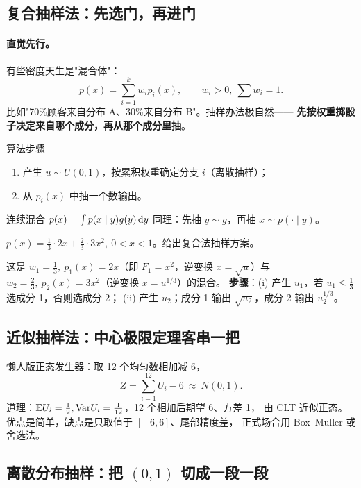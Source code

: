 \subsection{复合抽样法：先选门，再进门}

\paragraph{直觉先行。}
有些密度天生是"混合体"：
\[
p(x)=\sum_{i=1}^k w_ip_i(x),\qquad w_i>0,\ \textstyle\sum w_i=1.
\]
比如"70\%顾客来自分布 A、30\%来自分布 B"。抽样办法极自然——
\textbf{先按权重掷骰子决定来自哪个成分，再从那个成分里抽}。

\begin{ebox}{算法步骤}
\begin{enumerate}[leftmargin=2em]
  \item 产生 $u\sim U(0,1)$，按累积权重确定分支 $i$（离散抽样）；
  \item 从 $p_i(x)$ 中抽一个数输出。
\end{enumerate}
连续混合 $p(x)=\int p(x\mid y)g(y)\,\mathrm{d} y$ 同理：先抽 $y\sim g$，再抽 $x\sim p(\cdot\mid y)$。
\end{ebox}

\begin{exbox}[复合法抽样]
$p(x)=\frac13\cdot 2x+\frac23\cdot 3x^2,\ 0<x<1$。给出复合法抽样方案。
\end{exbox}
\begin{sol}
这是 $w_1=\frac13,\ p_1(x)=2x$（即 $F_1=x^2$，逆变换 $x=\sqrt u$）与
$w_2=\frac23,\ p_2(x)=3x^2$（逆变换 $x=u^{1/3}$）的混合。
\textbf{步骤}：(i) 产生 $u_1$，若 $u_1\le\frac13$ 选成分 1，否则选成分 2；
(ii) 产生 $u_2$；成分 1 输出 $\sqrt{u_2}$，成分 2 输出 $u_2^{1/3}$。
\end{sol}

\subsection{近似抽样法：中心极限定理客串一把}

懒人版正态发生器：取 12 个均匀数相加减 6，
\[
Z=\sum_{i=1}^{12}U_i-6\ \approx\ N(0,1).
\]
道理：$\mathbb{E} U_i=\frac12,\mathrm{Var} U_i=\frac1{12}$，12 个相加后期望 6、方差 1，
由 CLT 近似正态。优点是简单，缺点是只取值于 $[-6,6]$、尾部精度差，
正式场合用 Box--Muller 或舍选法。

\subsection{离散分布抽样：把 $(0,1)$ 切成一段一段}

